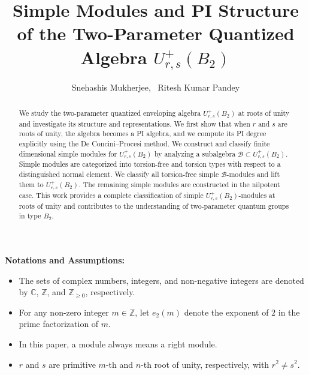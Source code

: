 \documentclass[12 pt,reqno]{amsart}
\numberwithin{equation}{section}
\newcommand{\Z}{\mathbb{Z}}
\newcommand{\C}{\mathbb{C}}
\newcommand{\B}{\mathcal{B}}
\theoremstyle{definition}
\theoremstyle{definition}
\theoremstyle{remark}
\theoremstyle{remark}
\begin{document}
\title{Simple Modules and PI Structure of the Two-Parameter Quantized Algebra $ U^+_{r,s}(B_2) $}
\author[ S. Mukherjee, \ Ritesh Kumar Pandey]{Snehashis Mukherjee,  \ Ritesh Kumar Pandey}
\address {\newline Snehashis Mukherjee$^1$ \newline Indian Institute of Technology Kanpur, 
  Kalyanpur, Kanpur, Uttar Pradesh, Box: 208016, India.
  \newline Ritesh Kumar Pandey$^2$ \newline Indian Institute of Technology Kanpur, 
  Kalyanpur, Kanpur, Uttar Pradesh, Box: 208016, India.}



\begin{abstract}
We study the two-parameter quantized enveloping algebra $ U^+_{r,s}(B_2) $ at  roots of unity and investigate its structure and representations. We first show that when $ r $ and $ s $ are roots of unity, the algebra becomes a PI algebra, and we compute its PI degree explicitly using the De Concini–Procesi method. We construct and classify finite dimensional simple modules for $ U^+_{r,s}(B_2) $ by analyzing a subalgebra $ \mathcal{B} \subset U^+_{r,s}(B_2) $. Simple modules are categorized into torsion-free and torsion types with respect to a distinguished normal element. We classify all torsion-free simple $ \B $-modules and lift them to $ U^+_{r,s}(B_2) $. The remaining simple modules are constructed in the nilpotent case. This work provides a complete classification of simple $ U^+_{r,s}(B_2) $-modules at roots of unity and contributes to the understanding of two-parameter quantum groups in type $ B_2 $.
\end{abstract}
\maketitle

{\bf{Notations and Assumptions:}} 
\begin{itemize}
\item The sets of complex numbers, integers, and non-negative integers are denoted by $\C$, $\Z$, and   $\Z_{\geq 0}$, respectively.
\item For any non-zero integer $m\in\Z$, let $e_2(m)$ denote the exponent of $2$ in the prime factorization of $m$.
\item In this paper, a module always means a right module.
\item $r$ and $s$ are primitive $m$-th and $n$-th root of unity, respectively, with $r^2\neq s^2$.
\end{itemize}
\end{document}
